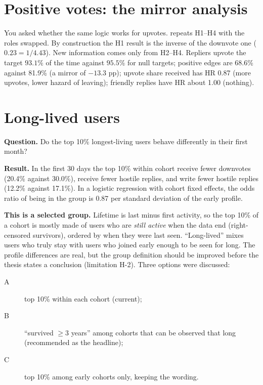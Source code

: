 \section{Positive votes: the mirror analysis}\label{sec:positive}
You asked whether the same logic works for upvotes.  repeats H1--H4 with the roles swapped. By construction the H1 result is the inverse of the downvote one ($0.23=1/4.43$). New information comes only from H2--H4. Repliers upvote the target $93.1\%$ of the time against $95.5\%$ for null targets; positive edges are 68.6\% against 81.9\% (a mirror of $-13.3$ pp); upvote share received has HR 0.87 (more upvotes, lower hazard of leaving); friendly replies have HR about 1.00 (nothing).

\section{Long-lived users}\label{sec:longlived}
\textbf{Question.} Do the top 10\% longest-living users behave differently in their first month?

\textbf{Result.} In the first 30 days the top 10\% within cohort receive fewer downvotes (20.4\% against 30.0\%), receive fewer hostile replies, and write fewer hostile replies (12.2\% against 17.1\%). In a logistic regression with cohort fixed effects, the odds ratio of being in the group is 0.87 per standard deviation of the early profile.

\begin{pitfall}
\textbf{This is a selected group.} Lifetime is last minus first activity, so the top 10\% of a cohort is mostly made of users who are \emph{still active} when the data end (right-censored survivors), ordered by when they were last seen. ``Long-lived'' mixes users who truly stay with users who joined early enough to be seen for long. The profile differences are real, but the group definition should be improved before the thesis states a conclusion (limitation H-2). Three options were discussed:
\begin{description}
  \item[A] top 10\% within each cohort (current);
  \item[B] ``survived $\ge3$ years'' among cohorts that can be observed that long (recommended as the headline);
  \item[C] top 10\% among early cohorts only, keeping the wording.
\end{description}
\end{pitfall}

